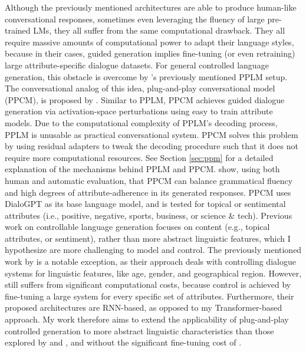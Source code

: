 Although the previously mentioned architectures are able to produce human-like conversational responses, sometimes even leveraging the fluency of large pre-trained LMs, they all suffer from the same computational drawback. They all require massive amounts of computational power to adapt their language styles, because in their cases, guided generation implies fine-tuning (or even retraining) large attribute-specific dialogue datasets. For general controlled language generation, this obstacle is overcome by \cite{dathathri2019plug}'s previously mentioned PPLM setup. The conversational analog of this idea, plug-and-play conversational model (PPCM), is proposed by \cite{madotto-etal-2020-plug}. Similar to PPLM, PPCM achieves guided dialogue generation via activation-space perturbations using easy to train attribute models. 
Due to the computational complexity of PPLM's decoding process, PPLM is unusable as practical conversational system. PPCM solves this problem by using residual adapters \citep{bapna-firat-2019-simple} to tweak the decoding procedure such that it does not require more computational resources. See Section \ref{sec:ppm} for a detailed explanation of the mechanisms behind PPLM and PPCM. \cite{madotto-etal-2020-plug} show, using both human and automatic evaluation, that PPCM can balance grammatical fluency and high degrees of attribute-adherence in its generated responses. PPCM uses DialoGPT as its base language model, and is tested for topical or sentimental attributes (i.e., positive, negative, sports, business, or science \& tech). 
Previous work on controllable language generation focuses on content (e.g., topical attributes, or sentiment), rather than more abstract linguistic features, which I hypothesize are more challenging to model and control. The previously mentioned work by \cite{zheng2019personalized} is a notable exception, as their approach deals with controlling dialogue systems for linguistic features, like age, gender, and geographical region. However, \cite{zheng2019personalized} still suffers from significant computational costs, because control is achieved by fine-tuning a large system for every specific set of attributes. Furthermore, their proposed architectures are RNN-based, as opposed to my Transformer-based approach. My work therefore aims to extend the applicability of plug-and-play controlled generation to more abstract linguistic characteristics than those explored by \cite{dathathri2019plug} and \cite{madotto-etal-2020-plug}, and without the significant fine-tuning cost of \cite{zheng2019personalized}.

 

